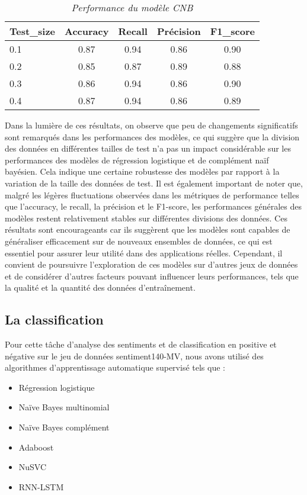 \begin{table}[h!]
    \centering
    \caption{\textit{Performance du modèle CNB}}
    \begin{tabular}{lcccc}
        \toprule
        Test\_size & Accuracy & Recall & Précision & F1\_score \\
        \midrule
        0.1 & 0.87 & 0.94 & 0.86 & 0.90 \\
        0.2 & 0.85 & 0.87 & 0.89 & 0.88 \\
        0.3 & 0.86 & 0.94 & 0.86 & 0.90 \\
        0.4 & 0.87 & 0.94 & 0.86 & 0.89 \\
        \bottomrule
    \end{tabular}
\end{table} 
\newpage

Dans la lumière de ces résultats, on observe que peu de changements significatifs sont remarqués dans les performances des modèles, ce qui suggère que la division des données en différentes tailles de test n'a pas un impact considérable sur les performances des modèles de régression logistique et de complément naïf bayésien. Cela indique une certaine robustesse des modèles par rapport à la variation de la taille des données de test. Il est également important de noter que, malgré les légères fluctuations observées dans les métriques de performance telles que l'accuracy, le recall, la précision et le F1-score, les performances générales des modèles restent relativement stables sur différentes divisions des données. Ces résultats sont encourageants car ils suggèrent que les modèles sont capables de généraliser efficacement sur de nouveaux ensembles de données, ce qui est essentiel pour assurer leur utilité dans des applications réelles. Cependant, il convient de poursuivre l'exploration de ces modèles sur d'autres jeux de données et de considérer d'autres facteurs pouvant influencer leurs performances, tels que la qualité et la quantité des données d'entraînement.


\subsection{La classification}
Pour cette tâche d’analyse des sentiments et de classification en positive et négative sur le jeu de données sentiment140-MV, nous avons utilisé des algorithmes d’apprentissage automatique supervisé tels que :
\begin{itemize}
    \item Régression logistique
    \item Naïve Bayes multinomial
    \item Naïve Bayes complément
    \item Adaboost
    \item NuSVC
    \item RNN-LSTM
\end{itemize}

